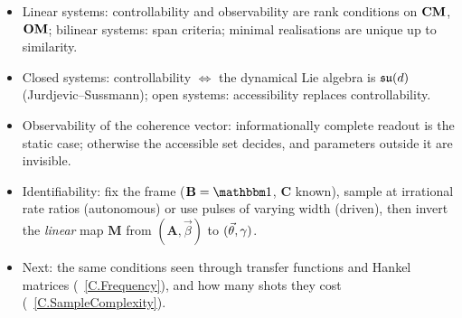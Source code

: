 \documentclass[handoutsbeamer.tex]{subfiles}
\begin{document}
\begin{frame}
\begin{itemize}\setlength\itemsep{0.5em}
    \item Linear systems: controllability and observability are rank conditions on $\CM$, $\OM$; bilinear systems: span criteria; minimal realisations are unique up to similarity.
    \item Closed systems: controllability $\Leftrightarrow$ the dynamical Lie algebra is $\liesu[d]$ (Jurdjevic--Sussmann); open systems: accessibility replaces controllability.
    \item Observability of the coherence vector: informationally complete readout is the static case; otherwise the accessible set decides, and parameters outside it are invisible.
    \item Identifiability: fix the frame ($\mathbf B=\Id$, $\mathbf C$ known), sample at irrational rate ratios (autonomous) or use pulses of varying width (driven), then invert the \emph{linear} map $\mathbf M$ from $(\mathbf A,\vec\beta)$ to $(\vec\theta,\Koss)$.
    \item Next: the same conditions seen through transfer functions and Hankel matrices (\Chap~\ref{C.Frequency}), and how many shots they cost (\Chap~\ref{C.SampleComplexity}).
\end{itemize}
\end{frame}

\biblio
\end{document}
